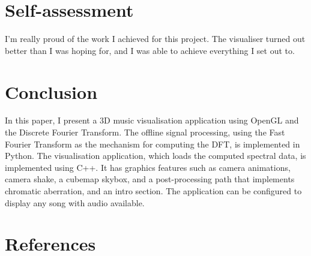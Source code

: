 \documentclass[11pt]{article}
\begin{document}
\section{Self-assessment}
I'm really proud of the work I achieved for this project. The visualiser turned out better than I was hoping
for, and I was able to achieve everything I set out to.

\section{Conclusion}
In this paper, I present a 3D music visualisation application using OpenGL and the Discrete Fourier
Transform. The offline signal processing, using the Fast Fourier Transform as the mechanism for computing the
DFT, is implemented in Python. The visualisation application, which loads the computed spectral data, is
implemented using C++. It has graphics features such as camera animations, camera shake, a cubemap skybox, and
a post-processing path that implements chromatic aberration, and an intro section. The application can be
configured to display any song with audio available.

\section{References}
\printbibliography[heading=none]
\end{document}
